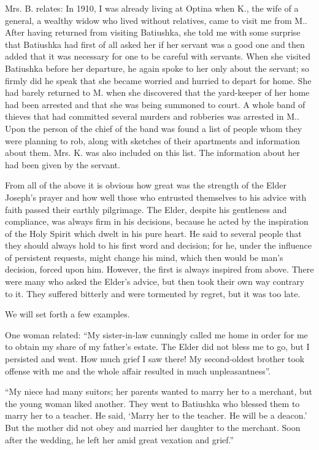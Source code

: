 \begin{longquote}{Mrs. B. relates:}
In 1910, I was already living at Optina when K., the wife of a general, a wealthy widow who lived without relatives, came to visit me from M.. After having returned from visiting Batiushka, she told me with some surprise that Batiushka had first of all asked her if her servant was a good one and then added that it was necessary for one to be careful with servants. When she visited Batiushka before her departure, he again spoke to her only about the servant; so firmly did he speak that she became worried and hurried to depart for home. She had barely returned to M. when she discovered that the yard-keeper of her home had been arrested and that she was being summoned to court. A whole band of thieves that had committed several murders and robberies was arrested in M.. Upon the person of the chief of the band was found a list of people whom they were planning to rob, along with sketches of their apartments and information about them. Mrs. K. was also included on this list. The information about her had been given by the servant.
\end{longquote}

From all of the above it is obvious how great was the strength of the Elder Joseph's prayer and how well those who entrusted themselves to his advice with faith passed their earthly pilgrimage. The Elder, despite his gentleness and compliance, was always firm in his decisions, because he acted by the inspiration of the Holy Spirit which dwelt in his pure heart. He said to several people that they should always hold to his first word and decision; for he, under the influence of persistent requests, might change his mind, which then would be man's decision, forced upon him. However, the first is always inspired from above. There were many who asked the Elder's advice, but then took their own way contrary to it. They suffered bitterly and were tormented by regret, but it was too late.

We will set forth a few examples.

\vspace{1cm}

One woman related: ``My sister-in-law cunningly called me home in order for me to obtain my share of my father's estate. The Elder did not bless me to go, but I persisted and went. How much grief I saw there! My second-oldest brother took offense with me and the whole affair resulted in much unpleasantness''.

``My niece had many suitors; her parents wanted to marry her to a merchant, but the young woman liked another. They went to Batiushka who blessed them to marry her to a teacher. He said, `Marry her to the teacher. He will be a deacon.' But the mother did not obey and married her daughter to the merchant. Soon after the wedding, he left her amid great vexation and grief.''

